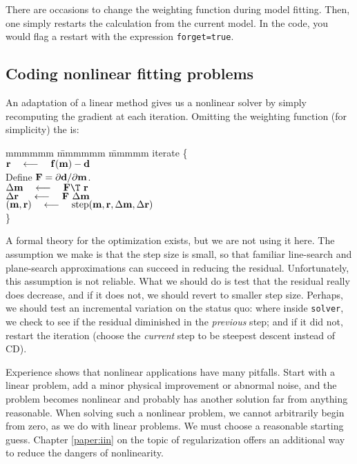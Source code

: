 \par
There are occasions to change the weighting function during model fitting.
Then, 
one simply restarts the calculation from the current model.
In the code, 
you would flag a restart with the expression \texttt{forget=true}.

\subsection{Coding nonlinear fitting problems}
An adaptation of a linear method gives us a nonlinear solver
by simply recomputing the gradient at each iteration.
Omitting the weighting function (for simplicity) the  is:
\begin{tabbing}
mmmmmm \= mmmmmm \= mmmmm \kill
\> {\rm iterate \{ }                                                    \\
\>      \> $\bold r \quad\longleftarrow\quad \bold f( \bold m) - \bold d$       \\
\>      \> Define $\bold F=\partial \bold d/\partial \bold m$.       \\
\>      \>  $\Delta\bold m  \padarrow \bold F\T\         \bold r$ \\
\>      \>  $\Delta\bold r\ \quad\longleftarrow\quad \bold F \ \Delta \bold m$  \\
\>      \>  $(\bold m,\bold r) \quad\longleftarrow\quad {\rm step}
             (\bold m,\bold r, \Delta\bold m,\Delta\bold r )$ \\
\>      \> \}
\end{tabbing}

\par
A formal theory for the optimization exists,
but we are not using it here.
The assumption we make is that the step size is small,
so that familiar line-search and plane-search approximations
can succeed in reducing the residual.
Unfortunately,
this assumption is not reliable.
What we should do is test that the residual really does decrease,
and if it does not, 
we should revert
to smaller step size.
Perhaps, we should test an incremental variation on the status quo:
where inside \texttt{solver}, %
we check to see if the residual
diminished in the {\it previous} step; and if it did not,
restart the iteration (choose the {\it current} step to be steepest descent instead of CD).
\par
Experience shows that nonlinear applications have many pitfalls.
Start with a linear problem,
add a minor physical improvement or abnormal noise,
and the problem becomes nonlinear and probably has another solution
far from anything reasonable.
When solving such a nonlinear problem,
we cannot arbitrarily begin from zero, as we do with linear problems.
We must choose a reasonable starting guess.
Chapter \ref{paper:iin} on the topic of regularization
offers an additional way to reduce the dangers of nonlinearity.

